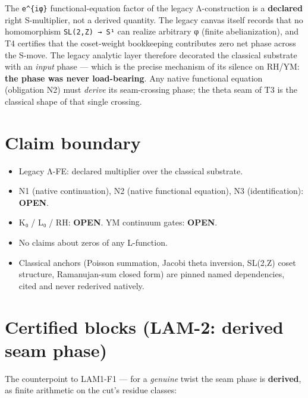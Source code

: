The \texttt{e\^{}\{iφ\}} functional-equation factor of the legacy Λ-construction is
a \textbf{declared} right S-multiplier, not a derived quantity. The legacy
canvas itself records that no homomorphism \texttt{SL(2,Z)\ →\ S¹} can realize
arbitrary φ (finite abelianization), and T4 certifies that the
coset-weight bookkeeping contributes zero net phase across the S-move.
The legacy analytic layer therefore decorated the classical substrate
with an \emph{input} phase --- which is the precise mechanism of its silence on
RH/YM: \textbf{the phase was never load-bearing}. Any native functional
equation (obligation N2) must \emph{derive} its seam-crossing phase; the
theta seam of T3 is the classical shape of that single crossing.

\hypertarget{claim-boundary}{%
\section{Claim boundary}\label{claim-boundary}}

\begin{itemize}
\tightlist
\item
  Legacy Λ-FE: declared multiplier over the classical substrate.
\item
  N1 (native continuation), N2 (native functional equation),
  N3 (identification): \textbf{OPEN}.
\item
  K₀ / L₀ / RH: \textbf{OPEN}. YM continuum gates: \textbf{OPEN}.
\item
  No claims about zeros of any L-function.
\item
  Classical anchors (Poisson summation, Jacobi theta inversion,
  SL(2,Z) coset structure, Ramanujan-sum closed form) are pinned named
  dependencies, cited and never rederived natively.
\end{itemize}

\hypertarget{certified-blocks-lam-2-derived-seam-phase}{%
\section{Certified blocks (LAM-2: derived seam phase)}\label{certified-blocks-lam-2-derived-seam-phase}}

The counterpoint to LAM1-F1 --- for a \emph{genuine} twist the seam phase is
\textbf{derived}, as finite arithmetic on the cut's residue classes:

